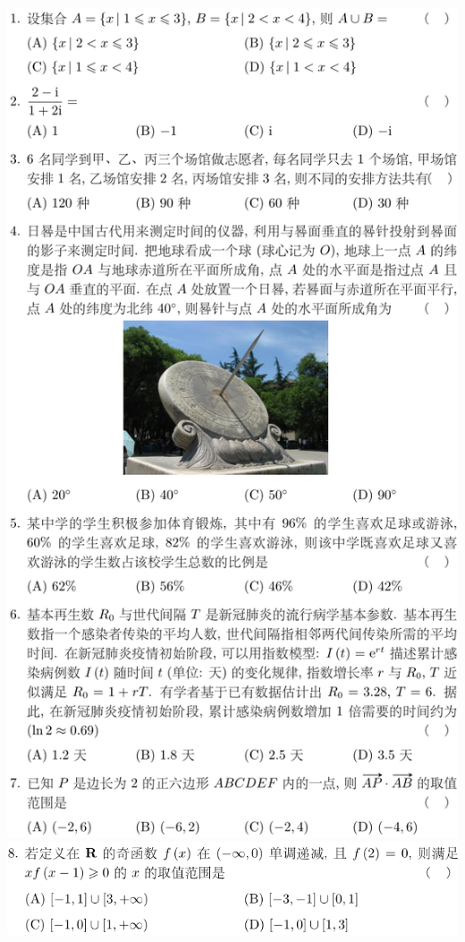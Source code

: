 \documentclass[11pt,a4paper]{ctexart}
\begin{document}
\begin{paracol}{2}
\includegraphics[width=\linewidth]{figure01.png}
\includegraphics[width=\linewidth]{figure01a.png}
\newpage
{}


\end{paracol}
\end{document}
